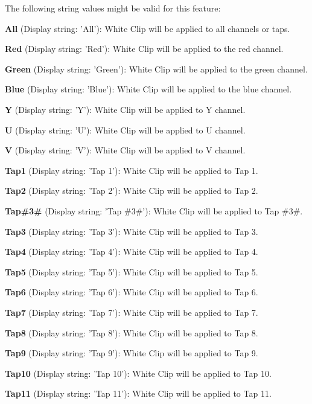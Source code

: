 The following string values might be valid for this feature\+:
\begin{DoxyItemize}
\item {\bfseries All} (Display string\+: 'All')\+: White Clip will be applied to all channels or taps.
\item {\bfseries Red} (Display string\+: 'Red')\+: White Clip will be applied to the red channel.
\item {\bfseries Green} (Display string\+: 'Green')\+: White Clip will be applied to the green channel.
\item {\bfseries Blue} (Display string\+: 'Blue')\+: White Clip will be applied to the blue channel.
\item {\bfseries Y} (Display string\+: 'Y')\+: White Clip will be applied to Y channel.
\item {\bfseries U} (Display string\+: 'U')\+: White Clip will be applied to U channel.
\item {\bfseries V} (Display string\+: 'V')\+: White Clip will be applied to V channel.
\item {\bfseries Tap1} (Display string\+: 'Tap 1')\+: White Clip will be applied to Tap 1.
\item {\bfseries Tap2} (Display string\+: 'Tap 2')\+: White Clip will be applied to Tap 2.
\item {\bfseries Tap\#3\#} (Display string\+: 'Tap \#3\#')\+: White Clip will be applied to Tap \#3\#.
\item {\bfseries Tap3} (Display string\+: 'Tap 3')\+: White Clip will be applied to Tap 3.
\item {\bfseries Tap4} (Display string\+: 'Tap 4')\+: White Clip will be applied to Tap 4.
\item {\bfseries Tap5} (Display string\+: 'Tap 5')\+: White Clip will be applied to Tap 5.
\item {\bfseries Tap6} (Display string\+: 'Tap 6')\+: White Clip will be applied to Tap 6.
\item {\bfseries Tap7} (Display string\+: 'Tap 7')\+: White Clip will be applied to Tap 7.
\item {\bfseries Tap8} (Display string\+: 'Tap 8')\+: White Clip will be applied to Tap 8.
\item {\bfseries Tap9} (Display string\+: 'Tap 9')\+: White Clip will be applied to Tap 9.
\item {\bfseries Tap10} (Display string\+: 'Tap 10')\+: White Clip will be applied to Tap 10.
\item {\bfseries Tap11} (Display string\+: 'Tap 11')\+: White Clip will be applied to Tap 11.

\end{DoxyItemize}
